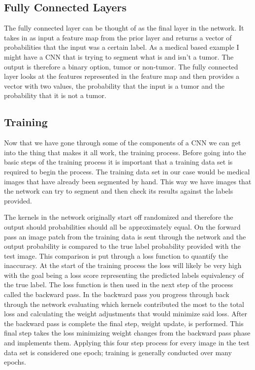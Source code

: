 \documentclass{sig-alternate}
\begin{document}
\subsection{Fully Connected Layers}
\label{sec:fullyConnected}

The fully connected layer can be thought of as the final layer in the network. It takes in as input a feature map from the prior layer and returns a vector of probabilities that the input was a certain label. As a medical based example I might have a CNN that is trying to segment what is and isn't a tumor. The output is therefore a binary option, tumor or non-tumor. The fully connected layer looks at the features represented in the feature map and then provides a vector with two values, the probability that the input is a tumor and the probability that it is not a tumor.

\subsection{Training}
\label{sec:training}

Now that we have gone through some of the components of a CNN we can get into the thing that makes it all work, the training process. Before going into the basic steps of the training process it is important that a training data set is required to begin the process. The training data set in our case would be medical images that have already been segmented by hand. This way we have images that the network can try to segment and then check its results against the labels provided.

The kernels in the network originally start off randomized and therefore the output should probabilities should all be approximately equal. On the forward pass an image patch from the training data is sent through the network and the output probability is compared to the true label probability provided with the test image. This comparison is put through a loss function to quantify the inaccuracy. At the start of the training process the loss will likely be very high with the goal being a loss score representing the predicted labels equivalency of the true label. The loss function is then used in the next step of the process called the backward pass. In the backward pass you progress through back through the network evaluating which kernels contributed the most to the total loss and calculating the weight adjustments that would minimize said loss. After the backward pass is complete the final step, weight update, is performed. This final step takes the loss minimizing weight changes from the backward pass phase and implements them. Applying this four step process for every image in the test data set is considered one epoch; training is generally conducted over many epochs.
\end{document}
